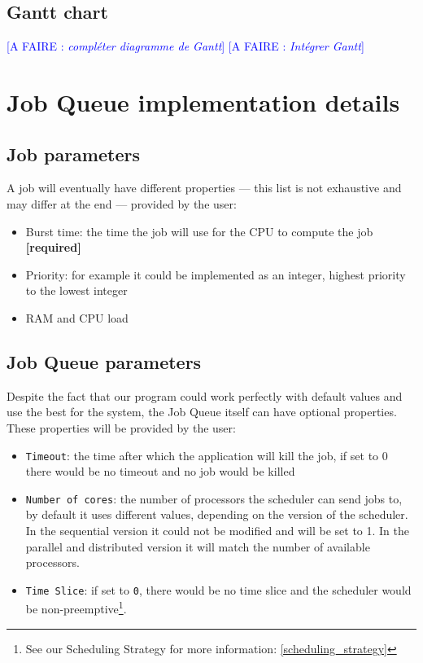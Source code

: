 \documentclass[a4paper,11pt]{article}
\newcommand*{\todo}[1]{\textcolor{blue}{[A FAIRE : \emph{#1}]}}
\begin{document}
\subsection{Gantt chart}

\todo{compléter diagramme de Gantt}
\todo{Intégrer Gantt}


\newpage

\section{Job Queue implementation details}\label{job_queue_implementation_details}

\subsection{Job parameters}\label{job_parameters}

A job will eventually have different properties --- this list is not exhaustive and may differ at the end --- provided by the user:

\begin{itemize}
\item Burst time: the time the job will use for the CPU to compute the job \textbf{[required]}
\item Priority: for example it could be implemented as an integer, highest priority to the lowest integer
\item RAM and CPU load
\end{itemize}

\subsection{Job Queue parameters}

Despite the fact that our program could work perfectly with default values and use the best for the system, the Job Queue itself can have optional properties. These properties will be provided by the user:
\begin{itemize}
\item \texttt{Timeout}: the time after which the application will kill the job, if set to 0 there would be no timeout and no job would be killed
\item \texttt{Number of cores}: the number of processors the scheduler can send jobs to, by default it uses different values, depending on the version of the scheduler. In the sequential version it could not be modified and will be set to 1. In the parallel and distributed version it will match the number of available processors.
\item \texttt{Time Slice}: if set to \texttt{0}, there would be no time slice and the scheduler would be non-preemptive\footnote{See our Scheduling Strategy for more information: \ref{scheduling_strategy}}.
\end{itemize}
\end{document}
